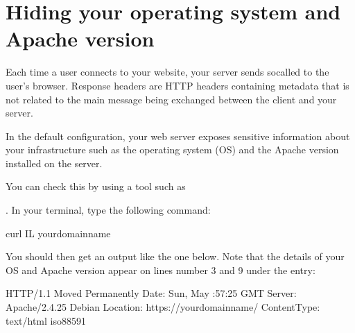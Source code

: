 \documentclass[a4paper,10pt,english,openany,oneside]{sphinxmanual}
\begin{document}
\begin{sloppypar}
\begin{enumerate}
\end{enumerate}


\section{Hiding your operating system and Apache version}
\label{\detokenize{hardening-apache:hiding-your-operating-system-and-apache-version}}
\sphinxAtStartPar
Each time a user connects to your website, your server sends so\sphinxhyphen{}called  to the user’s browser. Response headers are HTTP headers containing metadata that is not related to the main message being exchanged between the client and your server.

\sphinxAtStartPar
In the default configuration, your web server exposes sensitive information about your infrastructure such as the operating system (OS) and the Apache version installed on the server.

\sphinxAtStartPar
You can check this by using a tool such as %
\begin{footnote}[17]\sphinxAtStartFootnote
{}
%
\end{footnote}. In your terminal, type the following command:

\begin{sphinxVerbatim}[commandchars=\\\{\}]
\PYGZdl{} curl \PYGZhy{}IL your\PYGZhy{}domain\PYGZhy{}name
\end{sphinxVerbatim}

\sphinxAtStartPar
You should then get an output like the one below. Note that the details of your OS and Apache version appear on lines number 3 and 9 under the  entry:

\begin{sphinxVerbatim}[commandchars=\\\{\},numbers=left,firstnumber=1,stepnumber=1]
HTTP/1.1  Moved Permanently
Date: Sun,  May  :57:25 GMT
Server: Apache/2.4.25 Debian
Location: https://your\PYGZhy{}domain\PYGZhy{}name/
Content\PYGZhy{}Type: text/html iso\PYGZhy{}8859\PYGZhy{}1


\end{sphinxVerbatim}
\end{sloppypar}
\end{document}
